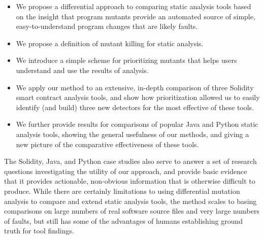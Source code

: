 \begin{itemize}[labelsep=3pt,leftmargin=12pt]
\item We propose a differential approach to comparing static analysis tools based on the insight that program mutants provide an automated source of simple, easy-to-understand program changes that are likely faults.
\item We propose a definition of mutant killing for static analysis.
\item We introduce a simple scheme for prioritizing mutants that helps users understand and use the results of analysis.
\item We apply our method to an extensive, in-depth comparison of three Solidity smart contract analysis tools, and show how prioritization allowed us to easily identify (and build) three new detectors for the most effective of these tools.
\item We further provide results for comparisons of popular Java and Python static analysis tools, showing the general usefulness of our methods, and giving a new picture of the comparative effectiveness of these tools.
\end{itemize}

The Solidity, Java, and Python case studies also serve to answer a set of research questions investigating the utility of our approach, and provide basic evidence that it provides actionable, non-obvious information that is otherwise difficult to produce.  While there are certainly limitations to using differential mutation analysis to compare and extend static analysis tools, the method scales to basing comparisons on large numbers of real software source files and very large numbers of faults, but still has some of the advantages of humans establishing ground truth for tool findings.
